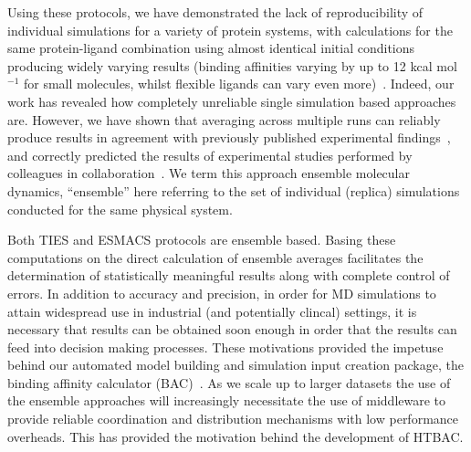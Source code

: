 Using these protocols, we have demonstrated the lack of reproducibility of
individual simulations for a variety of protein systems, with calculations for
the same protein-ligand combination using almost identical initial conditions
producing widely varying results (binding affinities varying by up to 12 kcal
mol $^{-1}$ for small molecules, whilst flexible ligands can vary even
more)~\cite{Wan2015, Sadiq2010, Wright2014}. Indeed, our work has revealed how
completely unreliable single simulation based approaches are. However, we have
shown that averaging across multiple runs can reliably produce results in
agreement with previously published experimental findings~\cite{Sadiq2010,
Wan2011, Wright2014, Bhati2017, Wan2017brd4, Wan2017trk}, and correctly
predicted the results of experimental studies performed by colleagues in
collaboration~\cite{Bunney2015}. We term this approach ensemble molecular
dynamics, ``ensemble'' here referring to the set of individual (replica)
simulations conducted for the same physical system. 

Both TIES and ESMACS protocols are ensemble based. 
Basing these computations on the direct calculation of ensemble averages facilitates
the determination of statistically meaningful results along with complete
control of errors. 
In addition to accuracy and
precision, in order for MD simulations to attain widespread use in industrial
(and potentially clincal) settings, it is necessary that results can be
obtained soon enough in order that the results can feed into decision making
processes. 
These motivations provided the impetuse behind our automated model building and 
simulation input creation package, the binding affinity calculator (BAC)~\cite{Sadiq2008}.
As we scale up to larger datasets the use of the ensemble
approaches will increasingly necessitate the use of middleware to provide
reliable coordination and distribution mechanisms with low performance
overheads.
This has provided the motivation behind the development of HTBAC.





